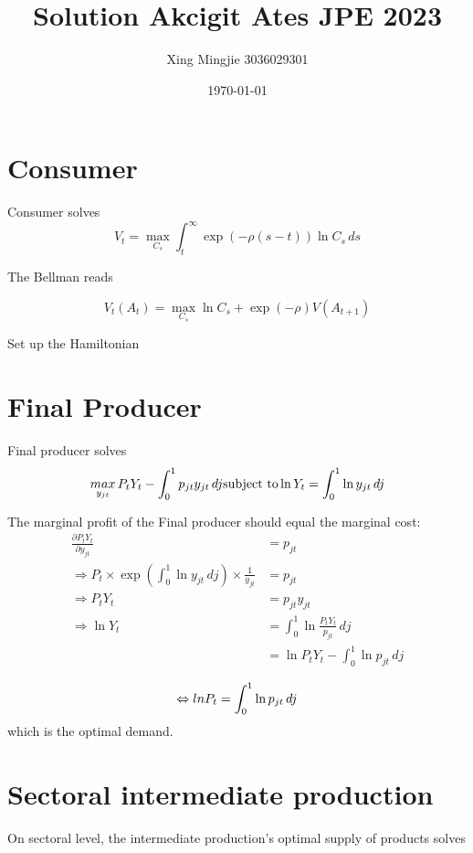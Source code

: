 \documentclass[12pt]{article} %
\title{Solution Akcigit Ates JPE 2023}
\author{Xing Mingjie 3036029301}
\date{\today} %
\begin{document}
\maketitle

\section{Consumer}

Consumer solves 
\[\begin{equation}
	V_t = \mathop{max}\limits_{C_s} \int_t^\infty \exp{(-\rho(s-t))}\ln C_s \, ds
\end{equation}\]

The Bellman reads 

\[\begin{equation}
	V_t(A_t) = \mathop{max}\limits_{C_s} \ln C_s + \exp{(-\rho)} V(A_{t+1})
\end{equation}\]

Set up the Hamiltonian

\section{Final Producer}

Final producer solves
\[\begin{equation*}
	\mathop{max}\limits_{y_{jt}} P_t Y_t - \int_0^1 p_{jt} y_{jt} \, dj\\
	\text{subject to} \ln{Y_t} = \int_0^1 \ln y_{jt} \, dj
\end{equation*}\]

The marginal profit of the Final producer should equal the marginal cost:
\[\begin{align}
	\frac{\partial P_t Y_t}{\partial y_{jt}} &= p_{jt}\\
	\Rightarrow
	P_t \times \exp{(\int_0^1 \ln y_{jt} \,dj)} \times \frac{1}{y_{jt}} &= p_{jt}\\
	\Rightarrow
	P_t Y_t &= p_{jt}y_{jt}\\
	\Rightarrow
	\ln Y_t &= \int^1_0 \ln \frac{P_tY_t}{p_{jt}}\, dj\\
		&= \ln P_tY_t - \int^1_0 \ln p_{jt}\, dj\\
\end{align}\]
\[\begin{equation}
	\Leftrightarrow
	lnP_t = \int^1_0 \ln p_{jt}\, dj\\
\end{equation}\]
which is the optimal demand.

\section{Sectoral intermediate production}
On sectoral level, the intermediate production's optimal supply of products solves
\end{document}
